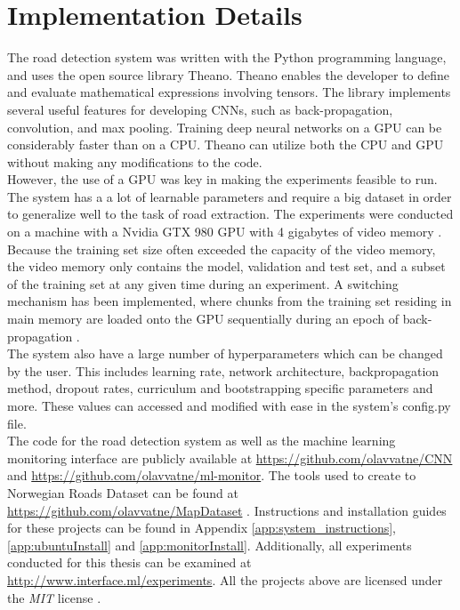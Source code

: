 \section{Implementation Details}
\label{sec:methods_implementation_details}
The road detection system was written with the Python programming language, and uses the open source library Theano. Theano enables the developer to define and evaluate mathematical expressions involving tensors. The library implements several useful features for developing \ac{CNN}s, such as back-propagation, convolution, and max pooling. Training deep neural networks on a \ac{GPU} can be considerably faster than on a \ac{CPU}. Theano can utilize both the \ac{CPU} and \ac{GPU} without making any modifications to the code.\\

However, the use of a \ac{GPU} was key in making the experiments feasible to run. The system has a a lot of learnable  parameters and require a big dataset in order to generalize well to the task of road extraction. The experiments were conducted on a machine with a Nvidia GTX 980 \ac{GPU} with 4 gigabytes of video memory . \\

Because the training set size often exceeded the capacity of the video memory, the video memory only contains the model, validation and test set, and a subset of the training set at any given time during an experiment. A switching mechanism has been implemented, where chunks from the training set residing in main memory are loaded onto the \ac{GPU} sequentially during an epoch of back-propagation .\\

The system also have a large number of hyperparameters which can be changed by the user. This includes learning rate, network architecture, backpropagation method, dropout rates, curriculum and bootstrapping specific parameters and more. These values can accessed and modified with ease in the system's config.py file. \\

The code for the road detection system as well as the machine learning monitoring interface are publicly available at 
\url{https://github.com/olavvatne/CNN} and \url{https://github.com/olavvatne/ml-monitor}. The tools used to create to Norwegian Roads Dataset can be found at \url{https://github.com/olavvatne/MapDataset} . Instructions and installation guides for these projects can be found in Appendix \ref{app:system_instructions}, \ref{app:ubuntuInstall} and \ref{app:monitorInstall}. Additionally, all experiments conducted for this thesis can be examined at \url{http://www.interface.ml/experiments}. All the projects above are licensed under the \emph{MIT} license .

